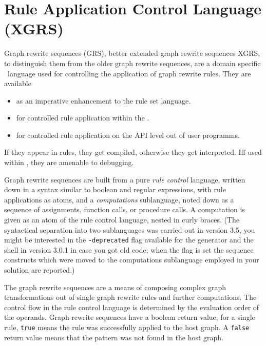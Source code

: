 \chapter{Rule Application Control Language (XGRS)}
\label{cha:xgrs}

Graph rewrite sequences (GRS), better extended graph rewrite sequences XGRS, to distinguish them from the older graph rewrite sequences, are a domain specific \GrG~language used for controlling the application of graph rewrite rules. 
They are available
\begin{itemize}
\item as an imperative enhancement to the rule set language.
\item for controlled rule application within the \GrShell.
\item for controlled rule application on the API level out of user programms.
\end{itemize}

If they appear in rules, they get compiled, otherwise they get interpreted.
Iff used within \GrShell, they are amenable to debugging.

Graph rewrite sequences are built from a pure \emph{rule control} language,
written down in a syntax similar to boolean and regular expressions, with rule applications as atoms,
and a \emph{computations} sublanguage,
noted down as a sequence of assignments, function calls, or procedure calls.
A computation is given as an atom of the rule control language, nested in curly braces.
(The syntactical separation into two sublanguages was carried out in version 3.5, you might be interested in the \texttt{-deprecated} flag available for the generator and the shell in version 3.0.1 in case you got old code; when the flag is set the sequence constructs which were moved to the computations sublanguage employed in your solution are reported.)

The graph rewrite sequences are a means of composing complex graph transformations out of single graph rewrite rules and further computations.
The control flow in the rule control language is determined by the evaluation order of the operands.
Graph rewrite sequences have a boolean return value; for a single rule, \texttt{true} means the rule was successfully applied to the host graph.
A \texttt{false} return value means that the pattern was not found in the host graph. 

